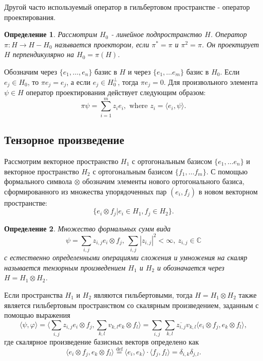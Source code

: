 \documentclass[%
master,         %
subf,           %
href,           %
colorlinks=true %
]{disser}
\numberwithin{equation}{section}
\numberwithin{figure}{section}
\newtheorem{definition}{Определение}[section]
\begin{document}
Другой часто используемый оператор в гильбертовом пространстве - оператор проектирования.
\begin{definition}
Рассмотрим $H_0$ - линейное подпространство $H$. Оператор $\pi: H \to H - H_0$ называется проектором, если $\pi^* = \pi$ и $\pi^2 = \pi$. Он проектирует $H$ перпендикулярно на $H_0 = \pi(H)$.
\end{definition}
Обозначим через $\{e_1, \ldots, e_n\}$ базис в $H$ и через $\{e_1, \ldots e_m\}$ базис в $H_0$. Если $e_j \in H_0$, то $\pi e_j = e_j$, а если $e_j\in H_0^\perp$, тогда $\pi e_j = 0$. Для произвольного элемента $\psi\in H$ оператор проектирования действует следующим образом: 
\[
\pi\psi = \sum_{i = 1}^m z_ie_i, \mbox{ where } z_i = \langle e_i, \psi\rangle.
\]

\subsection{Тензорное произведение}
Рассмотрим векторное пространство $H_1$ с ортогональным базисом $\{e_1, \ldots e_n\}$ и векторное пространство $H_2$ с ортогональным базисом $\{f_1,\ldots f_m\}$. С помощью формального символа $\otimes$ обозначим элементы нового ортогонального базиса, сформированного из множества упорядоченных пар $(e_i, f_j)$ в новом векторном пространстве:
\begin{equation}
\{e_i \otimes f_j | e_i \in H_1, f_j \in H_2\}. \label{eq:tensor_basis}
\end{equation}

\begin{definition}
Множество формальных сумм вида
\begin{equation}
\psi = \sum_{i,j}z_{i,j}e_i\otimes f_j,\ \sum_{i, j}|z_{i,j}|^2 < \infty,\  z_{i,j} \in \mathbb{C}
\label{eq:tensor_element}
\end{equation}
с естественно определенными операциями сложения и умножения на скаляр называется тензорным произведением $H_1$ и $H_2$ и обозначается через $H = H_1\otimes H_2$.
\end{definition}

Если пространства $H_1$ и $H_2$ являются гильбертовыми, тогда $H = H_1\otimes H_2$ также является гильбертовым пространством со скалярным произведением, заданным с помощью выражения
\[
\langle\psi, \varphi\rangle = \langle \sum_{i,j}z_{i,j}e_i\otimes f_j, \sum_{k,l}v_{k,l}e_k\otimes f_l \rangle = \sum_{i, j}\sum_{k, l}\overline{z_{i,j}}v_{k,l} \langle e_i\otimes f_j, e_k\otimes f_l \rangle,
\]
где скалярное произведение базисных векторв определено как
\[
\langle e_i\otimes f_j, e_k\otimes f_l \rangle \overset{\mbox{def}}= \langle e_i, e_k\rangle \cdot \langle f_j, f_l \rangle = \delta_{i, k}\delta_{j, l}.
\]
\end{document}
